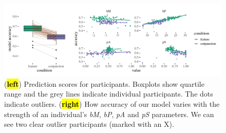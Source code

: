 \documentclass[vision,article,accept,pdftex,moreauthors]{Definitions/mdpi}
\begin{document}
\begin{figure}[H]
\includegraphics[width=13.5 cm]{Figures/qjep_indiv_diff.pdf}
\caption{({\textbf{\hl{left}}}) Prediction scores for participants. Boxplots show quartile range and the grey lines indicate individual participants. The dots indicate outliers. (\textbf{\hl{right}}) How accuracy of our model varies with the strength of an individual’s \textit{bM}, \textit{bP}, \textit{pA} and \textit{pS} parameters. We can see two clear outlier participants (marked with an X).} %

\label{fig:cal2}
\end{figure}   
\vspace{-12pt}
\end{document}
